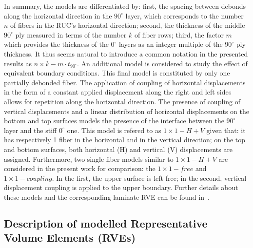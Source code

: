 \documentclass[review]{elsarticle}
\begin{document}
In summary, the models are differentiated by: first, the spacing between debonds along the horizontal direction in the $90^{\circ}$ layer, which corresponds to the number $n$ of fibers in the RUC's horizontal direction; second, the thickness of the middle $90^{\circ}$ ply measured in terms of the number $k$ of fiber rows; third, the factor $m$ which provides the thickness of the $0^{\circ}$ layers as an integer multiple of the $90^{\circ}$ ply thickness.  It thus seems natural to introduce a common notation in the presented results as $n\times k-m\cdot t_{90^{\circ}}$. An additional model is considered to study the effect of equivalent boundary conditions. This final model is constituted by only one partially debonded fiber. The application of coupling of horizontal displacements in the form of a constant applied displacement along the right and left sides allows for repetition along the horizontal direction. The presence of coupling of vertical displacements and a linear distribution of horizontal displacements on the bottom and top surfaces models the presence of the interface between the $90^{\circ}$ layer and the stiff $0^{\circ}$ one. This model is refered to as $1\times 1-H+V$ given that: it has respectively 1 fiber in the horizontal and in the vertical direction; on the top and bottom surfaces, both horizontal (H) and vertical (V) displacements are assigned. Furthermore, two single fiber models similar to  $1\times 1-H+V$ are considered in the present work for comparison: the  $1\times 1-free$ and  $1\times 1-coupling$. In the first, the upper surface is left free; in the second, vertical displacement coupling is applied to the upper boundary. Further details about these models and the corresponding laminate RVE can be found in~\cite{DiStasio2019}.


\subsection{Description of modelled Representative Volume Elements (RVEs)}\label{subsec:rve}
\end{document}
